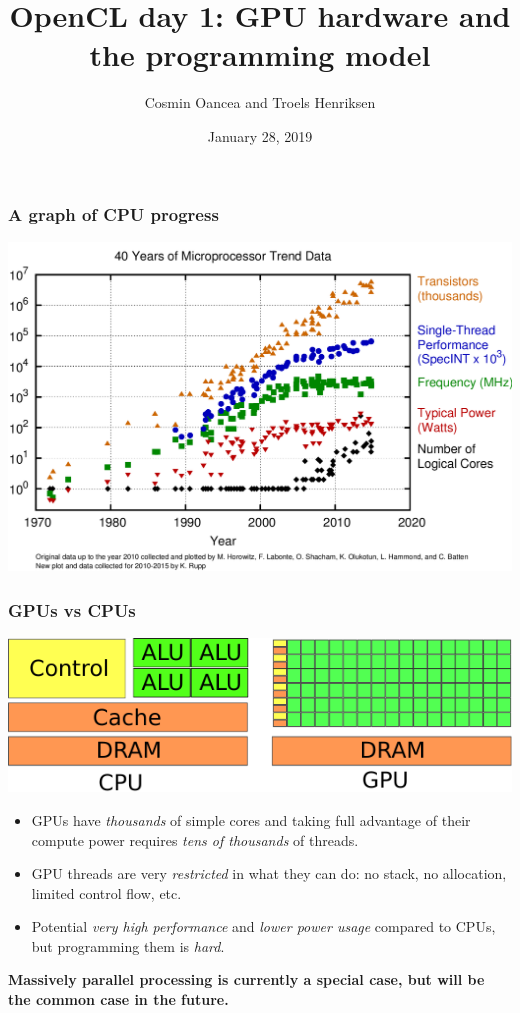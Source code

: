 \documentclass{beamer}
\title{OpenCL day 1: GPU hardware and the programming model}
\author{Cosmin Oancea and Troels Henriksen}
\date{January 28, 2019}
\begin{document}
\frame{\titlepage}

\begin{frame}
  \tableofcontents
\end{frame}

\begin{frame}
  \frametitle{A graph of CPU progress}

  \includegraphics[width=\textwidth]{img/40-years-processor-trend.png}

\end{frame}


\begin{frame}
  \frametitle{GPUs vs CPUs}

  \includegraphics[width=\textwidth]{img/cpu-gpu-architecture.pdf}

  \begin{itemize}
  \item GPUs have \textit{thousands} of simple cores and taking full
    advantage of their compute power requires \textit{tens of
      thousands} of threads.
  \item GPU threads are very \textit{restricted} in what they can do:
    no stack, no allocation, limited control flow, etc.
  \item Potential \textit{very high performance} and \textit{lower
      power usage} compared to CPUs, but programming them is
    \textit{hard}.
  \end{itemize}

  \textbf{Massively parallel processing is currently a special case,
    but will be the common case in the future.}
\end{frame}
\end{document}
